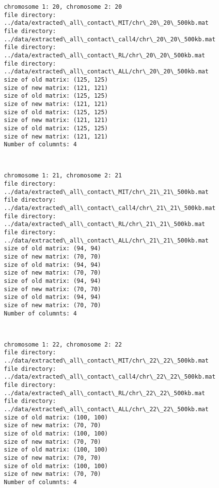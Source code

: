 \documentclass[11pt]{article}
\begin{document}
    \begin{Verbatim}[commandchars=\\\{\}]
chromosome 1: 20, chromosome 2: 20
file directory: ../data/extracted\_all\_contact\_MIT/chr\_20\_20\_500kb.mat
file directory: ../data/extracted\_all\_contact\_call4/chr\_20\_20\_500kb.mat
file directory: ../data/extracted\_all\_contact\_RL/chr\_20\_20\_500kb.mat
file directory: ../data/extracted\_all\_contact\_ALL/chr\_20\_20\_500kb.mat
size of old matrix: (125, 125)
size of new matrix: (121, 121)
size of old matrix: (125, 125)
size of new matrix: (121, 121)
size of old matrix: (125, 125)
size of new matrix: (121, 121)
size of old matrix: (125, 125)
size of new matrix: (121, 121)
Number of columnts: 4

    \end{Verbatim}

    \begin{center}
    \end{center}
    { \hspace*{\fill} \\}
    
    \begin{Verbatim}[commandchars=\\\{\}]
chromosome 1: 21, chromosome 2: 21
file directory: ../data/extracted\_all\_contact\_MIT/chr\_21\_21\_500kb.mat
file directory: ../data/extracted\_all\_contact\_call4/chr\_21\_21\_500kb.mat
file directory: ../data/extracted\_all\_contact\_RL/chr\_21\_21\_500kb.mat
file directory: ../data/extracted\_all\_contact\_ALL/chr\_21\_21\_500kb.mat
size of old matrix: (94, 94)
size of new matrix: (70, 70)
size of old matrix: (94, 94)
size of new matrix: (70, 70)
size of old matrix: (94, 94)
size of new matrix: (70, 70)
size of old matrix: (94, 94)
size of new matrix: (70, 70)
Number of columnts: 4

    \end{Verbatim}

    \begin{center}
    \end{center}
    { \hspace*{\fill} \\}
    
    \begin{Verbatim}[commandchars=\\\{\}]
chromosome 1: 22, chromosome 2: 22
file directory: ../data/extracted\_all\_contact\_MIT/chr\_22\_22\_500kb.mat
file directory: ../data/extracted\_all\_contact\_call4/chr\_22\_22\_500kb.mat
file directory: ../data/extracted\_all\_contact\_RL/chr\_22\_22\_500kb.mat
file directory: ../data/extracted\_all\_contact\_ALL/chr\_22\_22\_500kb.mat
size of old matrix: (100, 100)
size of new matrix: (70, 70)
size of old matrix: (100, 100)
size of new matrix: (70, 70)
size of old matrix: (100, 100)
size of new matrix: (70, 70)
size of old matrix: (100, 100)
size of new matrix: (70, 70)
Number of columnts: 4

    \end{Verbatim}
\end{document}
